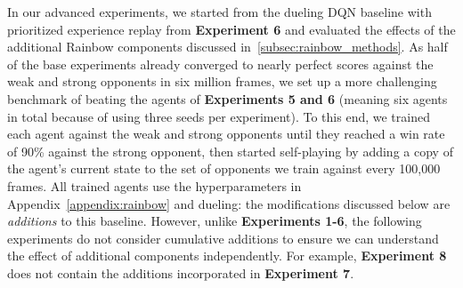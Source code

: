 In our advanced experiments, we started from the dueling DQN baseline with prioritized experience replay from \textbf{Experiment 6} and evaluated the effects of the additional Rainbow components discussed in~\ref{subsec:rainbow_methods}. As half of the base experiments already converged to nearly perfect scores against the weak and strong opponents in six million frames, we set up a more challenging benchmark of beating the agents of \textbf{Experiments 5 and 6} (meaning six agents in total because of using three seeds per experiment). To this end, we trained each agent against the weak and strong opponents until they reached a win rate of 90\% against the strong opponent, then started self-playing by adding a copy of the agent's current state to the set of opponents we train against every 100,000 frames. All trained agents use the hyperparameters in Appendix~\ref{appendix:rainbow} and dueling: the modifications discussed below are \emph{additions} to this baseline. However, unlike \textbf{Experiments 1-6}, the following experiments do not consider cumulative additions to ensure we can understand the effect of additional components independently. For example, \textbf{Experiment 8} does not contain the additions incorporated in \textbf{Experiment 7}.


